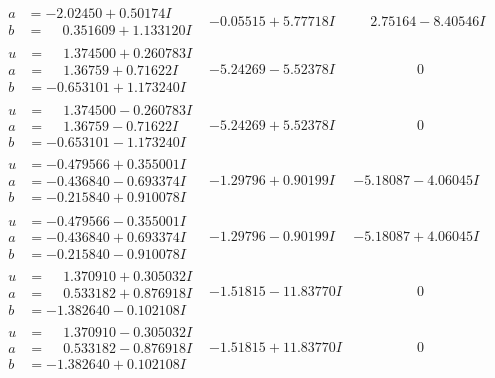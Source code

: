 \documentclass[1p]{elsarticle_modified}
\theoremstyle{definition}
\begin{document}
$$\begin{array}{c|c|c}
\begin{aligned}
a &= -2.02450 + 0.50174 I \\
b &= \phantom{-}0.351609 + 1.133120 I\end{aligned}
 & -0.05515 + 5.77718 I & \phantom{-}2.75164 - 8.40546 I \\ \hline\begin{aligned}
u &= \phantom{-}1.374500 + 0.260783 I \\
a &= \phantom{-}1.36759 + 0.71622 I \\
b &= -0.653101 + 1.173240 I\end{aligned}
 & -5.24269 - 5.52378 I & \phantom{-0.000000 } 0 \\ \hline\begin{aligned}
u &= \phantom{-}1.374500 - 0.260783 I \\
a &= \phantom{-}1.36759 - 0.71622 I \\
b &= -0.653101 - 1.173240 I\end{aligned}
 & -5.24269 + 5.52378 I & \phantom{-0.000000 } 0 \\ \hline\begin{aligned}
u &= -0.479566 + 0.355001 I \\
a &= -0.436840 - 0.693374 I \\
b &= -0.215840 + 0.910078 I\end{aligned}
 & -1.29796 + 0.90199 I & -5.18087 - 4.06045 I \\ \hline\begin{aligned}
u &= -0.479566 - 0.355001 I \\
a &= -0.436840 + 0.693374 I \\
b &= -0.215840 - 0.910078 I\end{aligned}
 & -1.29796 - 0.90199 I & -5.18087 + 4.06045 I \\ \hline\begin{aligned}
u &= \phantom{-}1.370910 + 0.305032 I \\
a &= \phantom{-}0.533182 + 0.876918 I \\
b &= -1.382640 - 0.102108 I\end{aligned}
 & -1.51815 - 11.83770 I & \phantom{-0.000000 } 0 \\ \hline\begin{aligned}
u &= \phantom{-}1.370910 - 0.305032 I \\
a &= \phantom{-}0.533182 - 0.876918 I \\
b &= -1.382640 + 0.102108 I\end{aligned}
 & -1.51815 + 11.83770 I & \phantom{-0.000000 } 0 \\ \hline\begin{aligned}

\end{aligned}
\end{array}$$
\end{document}
